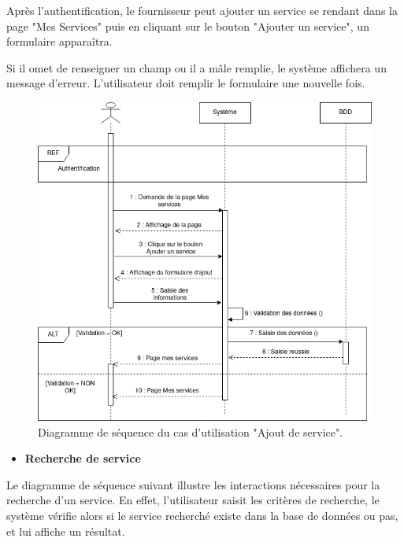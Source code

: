 \documentclass[french]{report}
\begin{document}
	Après l'authentification, le fournisseur peut ajouter un service se rendant dans
	la page "Mes Services" puis en cliquant sur le bouton "Ajouter un service", un formulaire apparaîtra.
	
	Si il omet de renseigner un champ ou il a mâle remplie, le système affichera un message d'erreur.
	L'utilisateur doit remplir le formulaire une nouvelle fois.
	
    \begin{figure}[H]
            \centering
            \includegraphics[width=1\textwidth]{images/Seq Diag Ajout Services.drawio.png}
            \caption{Diagramme de séquence du cas d'utilisation "Ajout de service".}
            \label{fig:my_label}
    \end{figure}
        
\newpage
\begin{itemize}
\item \textbf{Recherche de service}
\end{itemize}
    Le diagramme de séquence suivant illustre les interactions nécessaires pour 
    la recherche d'un service. En effet, l'utilisateur saisit les critères de recherche,
    le système vérifie alors si le service recherché existe dans la base de données ou pas, et lui affiche un résultat.
        
\end{document}
